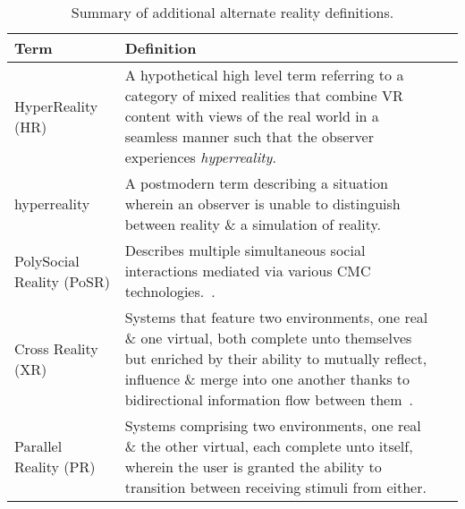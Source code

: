\begin{table}
\begin{center}
\begin{tabularx}{\textwidth}{l *{2}{>{\centering\arraybackslash}X}}

\toprule

\textbf{Term} & \textbf{Definition} \\

\midrule

		
HyperReality (HR) & A hypothetical high level term referring to a category of mixed realities that combine VR content with views of the real world in a seamless manner such that the observer experiences \textit{hyperreality}. \\
		
\midrule
		

hyperreality & A postmodern term describing a situation wherein an observer is unable to distinguish between reality \& a simulation of reality. \\

\midrule

		
PolySocial Reality (PoSR) & Describes multiple simultaneous social interactions mediated via various CMC technologies.~\cite{Applin2012}. \\

\midrule


Cross Reality (XR) & Systems that feature two environments, one real \& one virtual, both complete unto themselves~\cite{lifton:merging} but enriched by their ability to mutually reflect, influence \& merge into one another thanks to bidirectional information flow between them~\cite{kim:practical}. \\

\midrule


Parallel Reality (PR) & Systems comprising two environments, one real \& the other virtual, each complete unto itself, wherein the user is granted the ability to transition between receiving stimuli from either. \\


\bottomrule
\end{tabularx}
\end{center}
\caption{Summary of additional alternate reality definitions.}
\end{table}


